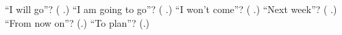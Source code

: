 \begin{tcolorbox}[breakable,colback=teal!4,colframe=teal!35!black,title={Before you move on}]
\textquotedblleft{}I will go\textquotedblright{}? (\textbf{ }.) \textquotedblleft{}I am going to go\textquotedblright{}? (\textbf{  }.) \textquotedblleft{}I won't come\textquotedblright{}? (\textbf{  }.) \textquotedblleft{}Next week\textquotedblright{}? (\textbf{ }.) \textquotedblleft{}From now on\textquotedblright{}? (\textbf{}.) \textquotedblleft{}To plan\textquotedblright{}? (\textbf{}.)
\end{tcolorbox}
